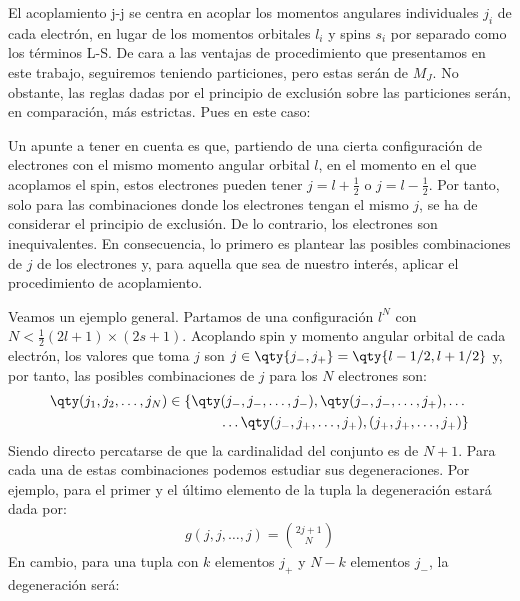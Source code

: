 El acoplamiento j-j se centra en acoplar los momentos angulares individuales $j_{i}$ de cada electrón, en lugar de los momentos orbitales $l_{i}$ y spins $s_{i}$ por separado como los términos L-S. De cara a las ventajas de procedimiento que presentamos en este trabajo, seguiremos teniendo particiones, pero estas serán de $M_{J}$. No obstante, las reglas dadas por el principio de exclusión sobre las particiones serán, en comparación, más estrictas. Pues en este caso: 
\begin{center}
\end{center} 
Un apunte a tener en cuenta es que, partiendo de una cierta configuración de electrones con el mismo momento angular orbital $l$, en el momento en el que acoplamos el spin, estos electrones pueden tener $j = l + \frac{1}{2}$ o $j = l - \frac{1}{2}$. Por tanto, solo para las combinaciones donde los electrones tengan el mismo $j$, se ha de considerar el principio de exclusión. De lo contrario, los electrones son inequivalentes. En consecuencia, lo primero es plantear las posibles combinaciones de $j$ de los electrones y, para aquella que sea de nuestro interés, aplicar el procedimiento de acoplamiento. \par 
Veamos un ejemplo general. Partamos de una configuración $l^{N}$ con $N < \frac{1}{2} (2l+1)\times(2s+1)$. Acoplando spin y momento angular orbital de cada electrón, los valores que toma $j$ son $j \in \qty{j_{-}, j_{+}} = \qty{l - 1/2, l + 1/2}$ y, por tanto, las posibles combinaciones de $j$  para los $N$ electrones son: 
\begin{align*}
\qty(j_{1}, j_{2}, \dots, j_{N}) \in \left\{\qty(j_{-}, j_{-}, \dots, j_{-}), \qty(j_{-}, j_{-}, \dots, j_{+}), \dots\right.\\ 
\left. \dots\qty(j_{-}, j_{+}, \dots,j_{+}), (j_{+}, j_{+}, \dots, j_{+})\right\}
\end{align*}
Siendo directo percatarse de que la cardinalidad del conjunto es de $N+1$. Para cada una de estas combinaciones podemos estudiar sus degeneraciones. Por ejemplo, para el primer y el último elemento de la tupla la degeneración estará dada por: 
\begin{align*}
g(j, j, \dots, j) = \binom{2j+1}{N} 
\end{align*}
En cambio, para una tupla con $k$ elementos $j_{+}$ y $N-k$ elementos $j_{-}$, la degeneración será:
